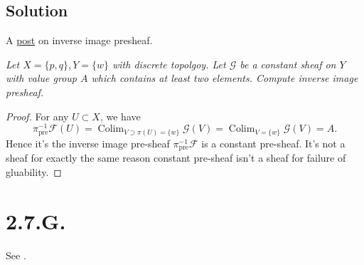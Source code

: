 \subsection{Solution}

A \href{https://math.stackexchange.com/questions/439769/inverse-image-presheaf}{post} on inverse image presheaf.

\textit{Let $X=\{p,q\}, Y=\{w\}$ with discrete topolgoy. Let $\mathscr G$ be a constant sheaf on $Y$ with value group $A$ which contains at least two elements. Compute inverse image presheaf.}
\begin{proof}
	For any $U\subset X$, we have 
	\[\pi_{\text{pre}}^{-1}\mathscr F(U)=\operatorname{Colim}_{V\supset \pi(U)=\{w\}}\mathscr G(V)=\operatorname{Colim}_{V=\{w\}}\mathscr G(V)=A.\]
	Hence it's the inverse image pre-sheaf $\pi_{\text{pre}}^{-1}\mathscr F$ is a constant pre-sheaf. It's not a sheaf for exactly the same reason constant pre-sheaf isn't a sheaf for failure of gluability.
\end{proof}


\section{2.7.G.}

See .
